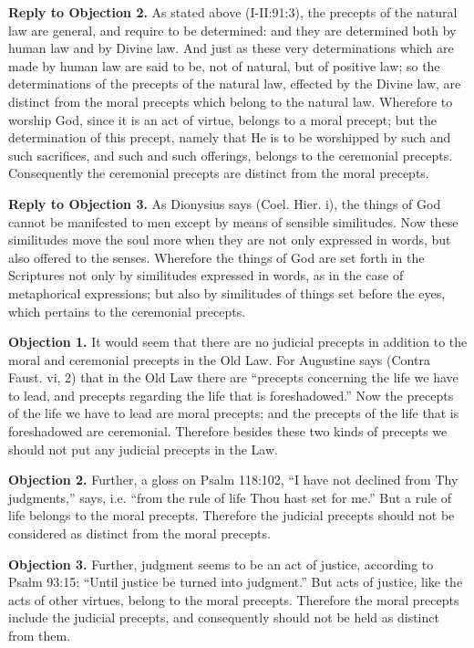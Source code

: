 \textbf{Reply to Objection 2.} As stated above (I-II:91:3), the precepts of the natural law are general, and require to be determined: and they are determined both by human law and by Divine law. And just as these very determinations which are made by human law are said to be, not of natural, but of positive law; so the determinations of the precepts of the natural law, effected by the Divine law, are distinct from the moral precepts which belong to the natural law. Wherefore to worship God, since it is an act of virtue, belongs to a moral precept; but the determination of this precept, namely that He is to be worshipped by such and such sacrifices, and such and such offerings, belongs to the ceremonial precepts. Consequently the ceremonial precepts are distinct from the moral precepts.

\textbf{Reply to Objection 3.} As Dionysius says (Coel. Hier. i), the things of God cannot be manifested to men except by means of sensible similitudes. Now these similitudes move the soul more when they are not only expressed in words, but also offered to the senses. Wherefore the things of God are set forth in the Scriptures not only by similitudes expressed in words, as in the case of metaphorical expressions; but also by similitudes of things set before the eyes, which pertains to the ceremonial precepts.


\textbf{Objection 1.} It would seem that there are no judicial precepts in addition to the moral and ceremonial precepts in the Old Law. For Augustine says (Contra Faust. vi, 2) that in the Old Law there are ``precepts concerning the life we have to lead, and precepts regarding the life that is foreshadowed.'' Now the precepts of the life we have to lead are moral precepts; and the precepts of the life that is foreshadowed are ceremonial. Therefore besides these two kinds of precepts we should not put any judicial precepts in the Law.

\textbf{Objection 2.} Further, a gloss on Psalm 118:102, ``I have not declined from Thy judgments,'' says, i.e. ``from the rule of life Thou hast set for me.'' But a rule of life belongs to the moral precepts. Therefore the judicial precepts should not be considered as distinct from the moral precepts.

\textbf{Objection 3.} Further, judgment seems to be an act of justice, according to Psalm 93:15: ``Until justice be turned into judgment.'' But acts of justice, like the acts of other virtues, belong to the moral precepts. Therefore the moral precepts include the judicial precepts, and consequently should not be held as distinct from them.

